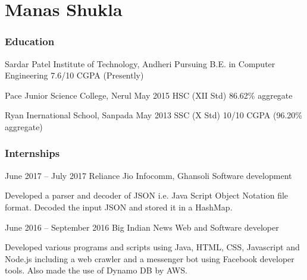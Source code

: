 \documentclass{tccv}
\begin{document}
\part{Manas Shukla}

\section{Education}

\begin{yearlist}
\item[Sardar Patel Institute of Technology, Andheri]{Pursuing}
     {B.E. in Computer Engineering}
     {7.6/10 CGPA (Presently)}

\item[Pace Junior Science College, Nerul]{May 2015}
     {HSC (XII Std)}
     {86.62\% aggregate}

\item[Ryan Inernational School, Sanpada]{May 2013}
     {SSC (X Std)}
     {10/10 CGPA (96.20\% aggregate)}
     
     

\end{yearlist}

\section{Internships}

\begin{eventlist}

\item{June 2017 -- July 2017}
     {Reliance Jio Infocomm, Ghansoli}
     {Software development}

Developed a parser and decoder of JSON
i.e. Java Script Object Notation 
file format. Decoded the input JSON and
stored it in a HashMap.

\item{June 2016 -- September 2016}
     {Big Indian News}
     {Web and Software developer}

Developed various programs and scripts using Java, HTML, CSS,
Javascript and Node.js including a web crawler and a messenger bot 
using Facebook developer tools. Also made the use of Dynamo DB by AWS.

\end{eventlist}
\end{document}
